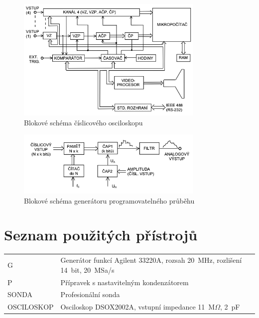 \documentclass[a4paper,12pt]{article}   %
\newcommand{\tohm}{$\Omega$}
\begin{document}
\begin{figure}[h!]
  \centering
  \includegraphics[width = 0.8\textwidth]{blokove_schema_osciloskop.png}
  \caption{Blokové schéma číslicového osciloskopu}
  \label{fig:blok_osc}
\end{figure}

\begin{figure}[h!]
  \centering
  \includegraphics[width = 0.8\textwidth]{blokove_schema_generator.png}
  \caption{Blokové schéma generátoru programovatelného průběhu}
  \label{fig:blok_generator}
\end{figure}


\section{Seznam použitých přístrojů}
\label{chap:seznam_pristroju}
\begin{table}[H]
  \centering
  \begin{tabular}{ll}
    G&Generátor funkcí Agilent 33220A, rozsah 20~MHz, rozlišení 14~bit, 20~MSa/s\\
    P&Přípravek s nastavitelným kondenzátorem\\
    SONDA&Profesionální sonda\\
    OSCILOSKOP&Osciloskop DSOX2002A, vstupní impedance 11~M\tohm , 2~pF
  \end{tabular}
\end{table}
\end{document}
